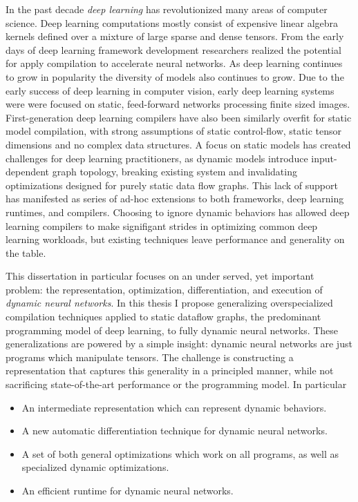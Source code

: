 \begin{fullwidth}
\begin{center}

In the past decade \emph{deep learning} has revolutionized many areas of
    computer science.
Deep learning computations mostly consist
    of expensive linear algebra kernels defined over a mixture
    of large sparse and dense tensors.
From the early days of deep learning framework development researchers realized the
    potential for apply compilation to accelerate neural networks.
As deep learning continues to grow in popularity the diversity
    of models also continues to grow.
Due to the early success of deep learning in computer
    vision, early deep learning systems were were focused on static,
    feed-forward networks processing finite sized images.
First-generation deep learning compilers have also been similarly overfit
    for static model compilation, with strong assumptions of static control-flow,
    static tensor dimensions and no complex data structures.
A focus on static models has created challenges for deep learning practitioners,
    as dynamic models introduce input-dependent graph topology,
    breaking existing system and invalidating optimizations
    designed for purely static data flow graphs.
This lack of support has manifested as series of ad-hoc extensions to
  both frameworks, deep learning runtimes, and compilers.
Choosing to ignore dynamic behaviors has allowed deep learning
    compilers to make signifigant strides in optimizing common
    deep learning workloads, but existing techniques leave performance
    and generality on the table.

This dissertation in particular focuses on an under served, yet important problem:
  the representation,
  optimization,
  differentiation,
  and execution of \emph{dynamic neural networks}.
In this thesis I propose generalizing overspecialized
  compilation techniques applied to static dataflow graphs,
  the predominant programming model of deep learning,
  to fully dynamic neural networks.
These generalizations are powered by a simple insight:
  dynamic neural networks are just programs which manipulate tensors.
The challenge is constructing a representation that captures this generality
  in a principled manner, while not sacrificing state-of-the-art performance or the programming model.
In particular
\begin{itemize}
    \item An intermediate representation which can represent dynamic behaviors.
    \item A new automatic differentiation technique for dynamic neural networks.
    \item A set of both general optimizations which work on all programs, as well
          as specialized dynamic optimizations.
    \item An efficient runtime for dynamic neural networks.
\end{itemize}


\end{center}
\end{fullwidth}
